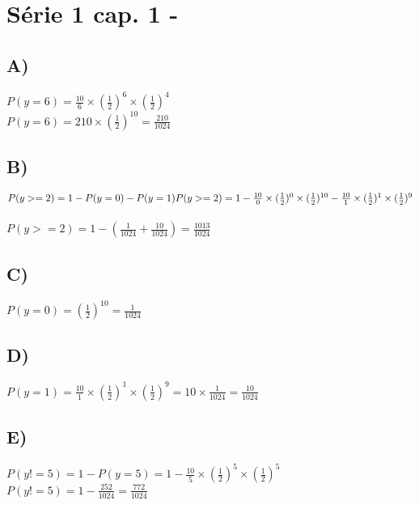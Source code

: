 \section*{Série 1 cap. 1 - }
    
    \subsection*{A)}
    $P(y=6) = \frac{10}{6}\times(\frac{1}{2})^6\times(\frac{1}{2})^4$\\
    $P(y=6) = 210\times(\frac{1}{2})^{10} = \frac{210}{1024}$
    
    \subsection*{B)}
    $P(y >= 2) = 1 - P(y = 0) - P(y = 1)\\ \\
    P(y >= 2) = 1 - \frac{10}{0}\times(\frac{1}{2})^0\times(\frac{1}{2})^{10} - \frac{10}{1}\times(\frac{1}{2})^1\times(\frac{1}{2})^9$\\ \\
    $P(y >= 2) = 1 - (\frac{1}{1024} + \frac{10}{1024}) = \frac{1013}{1024}$
    
    
    \subsection*{C)}
    $P(y=0) = (\frac{1}{2})^{10} = \frac{1}{1024}$
    
    \subsection*{D)}
    $P(y=1) = \frac{10}{1}\times(\frac{1}{2})^1\times(\frac{1}{2})^9 = 10 \times \frac{1}{1024} = \frac{10}{1024}$
    
    \subsection*{E)}
    $P(y != 5) = 1 - P(y = 5) = 1 - \frac{10}{5}\times(\frac{1}{2})^5\times(\frac{1}{2})^5$\\
    $P(y != 5) = 1 - \frac{252}{1024} = \frac{772}{1024}$
    

